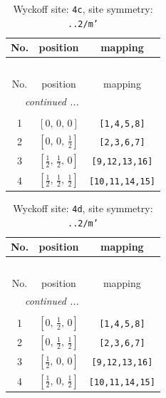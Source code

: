 \documentclass[fleqn,8pt]{jsarticle}
\begin{document}
\renewcommand{\arraystretch}{1.2}
\begin{longtable}{ccc}
\caption{Wyckoff site: {\tt 4c}, site symmetry: {\tt ..2/m'}}
 \\
 \hline \hline
No. & position & mapping \\ \hline \endfirsthead

\multicolumn{2}{l}{\tablename\ \thetable{}} \\
 \hline \hline
No. & position & mapping \\ \hline \endhead

 \hline \hline
\multicolumn{2}{r}{\footnotesize\it continued ...} \\ \endfoot

 \hline \hline
\multicolumn{2}{r}{} \\ \endlastfoot

1 & $\left[ 0,\, 0,\, 0 \right]$ & {\tt [1,4,5,8]} \\ \hline
2 & $\left[ 0,\, 0,\, \frac{1}{2} \right]$ & {\tt [2,3,6,7]} \\ \hline
3 & $\left[ \frac{1}{2},\, \frac{1}{2},\, 0 \right]$ & {\tt [9,12,13,16]} \\ \hline
4 & $\left[ \frac{1}{2},\, \frac{1}{2},\, \frac{1}{2} \right]$ & {\tt [10,11,14,15]} \\
\end{longtable}
\renewcommand{\arraystretch}{1.2}
\begin{longtable}{ccc}
\caption{Wyckoff site: {\tt 4d}, site symmetry: {\tt ..2/m'}}
 \\
 \hline \hline
No. & position & mapping \\ \hline \endfirsthead

\multicolumn{2}{l}{\tablename\ \thetable{}} \\
 \hline \hline
No. & position & mapping \\ \hline \endhead

 \hline \hline
\multicolumn{2}{r}{\footnotesize\it continued ...} \\ \endfoot

 \hline \hline
\multicolumn{2}{r}{} \\ \endlastfoot

1 & $\left[ 0,\, \frac{1}{2},\, 0 \right]$ & {\tt [1,4,5,8]} \\ \hline
2 & $\left[ 0,\, \frac{1}{2},\, \frac{1}{2} \right]$ & {\tt [2,3,6,7]} \\ \hline
3 & $\left[ \frac{1}{2},\, 0,\, 0 \right]$ & {\tt [9,12,13,16]} \\ \hline
4 & $\left[ \frac{1}{2},\, 0,\, \frac{1}{2} \right]$ & {\tt [10,11,14,15]} \\
\end{longtable}
\end{document}
